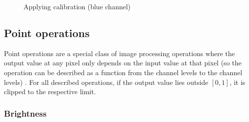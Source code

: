 \documentclass{article}
\begin{document}
\begin{figure}[H]
  \caption{Applying calibration (blue channel)}
  \centering
  
\end{figure}

\subsection{Point operations}

Point operations are a special class of image processing operations where the output value
at any pixel only depends on the input value at that pixel (so the operation
can be described as a function from the channel levels to the channel levels) \cite{pointwise_gimp}.
For all described operations, if the output value lies outside $[0, 1]$,
it is clipped to the respective limit.

\subsubsection{Brightness}
\end{document}
